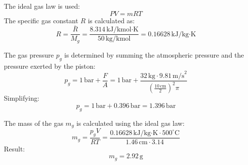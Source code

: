 The ideal gas law is used:  
\[
PV = mRT
\]  
The specific gas constant \( R \) is calculated as:  
\[
R = \frac{\bar{R}}{M_g} = \frac{8.314 \, \text{kJ}/\text{kmol·K}}{50 \, \text{kg}/\text{kmol}} = 0.16628 \, \text{kJ}/\text{kg·K}
\]  

The gas pressure \( p_g \) is determined by summing the atmospheric pressure and the pressure exerted by the piston:  
\[
p_g = 1 \, \text{bar} + \frac{F}{A} = 1 \, \text{bar} + \frac{32 \, \text{kg} \cdot 9.81 \, \text{m/s}^2}{\left(\frac{10 \, \text{cm}}{2}\right)^2 \pi}
\]  
Simplifying:  
\[
p_g = 1 \, \text{bar} + 0.396 \, \text{bar} = 1.396 \, \text{bar}
\]  

The mass of the gas \( m_g \) is calculated using the ideal gas law:  
\[
m_g = \frac{p_g V}{RT} = \frac{0.16628 \, \text{kJ}/\text{kg·K} \cdot 500^\circ\text{C}}{1.46 \, \text{cm} \cdot 3.14}
\]  
Result:  
\[
m_g = 2.92 \, \text{g}
\]